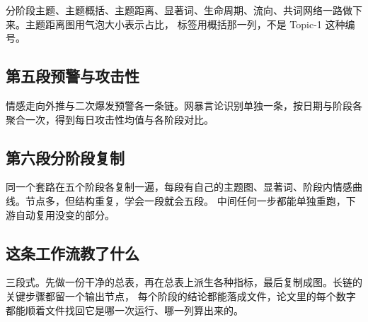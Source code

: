 分阶段主题、主题概括、主题距离、显著词、生命周期、流向、共词网络一路做下来。主题距离图用气泡大小表示占比，
标签用概括那一列，不是 Topic-1 这种编号。

\subsection{第五段\quad 预警与攻击性}

情感走向外推与二次爆发预警各一条链。网暴言论识别单独一条，按日期与阶段各聚合一次，得到每日攻击性均值与各阶段对比。

\subsection{第六段\quad 分阶段复制}

同一个套路在五个阶段各复制一遍，每段有自己的主题图、显著词、阶段内情感曲线。节点多，但结构重复，学会一段就会五段。
中间任何一步都能单独重跑，下游自动复用没变的部分。

\subsection{这条工作流教了什么}

三段式。先做一份干净的总表，再在总表上派生各种指标，最后复制成图。长链的关键步骤都留一个输出节点，
每个阶段的结论都能落成文件，论文里的每个数字都能顺着文件找回它是哪一次运行、哪一列算出来的。
